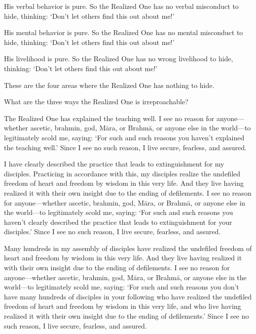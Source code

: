 \documentclass[12pt,openany]{book}%
\begin{document}
His verbal behavior is pure. So the Realized One has no verbal misconduct to hide, thinking: ‘Don’t let others find this out about me!’ 

His mental behavior is pure. So the Realized One has no mental misconduct to hide, thinking: ‘Don’t let others find this out about me!’ 

His livelihood is pure. So the Realized One has no wrong livelihood to hide, thinking: ‘Don’t let others find this out about me!’ 

These are the four areas where the Realized One has nothing to hide. 

What are the three ways the Realized One is irreproachable? 

The Realized One has explained the teaching well. I see no reason for anyone—whether ascetic, brahmin, god, \textsanskrit{Māra}, or \textsanskrit{Brahmā}, or anyone else in the world—to legitimately scold me, saying: ‘For such and such reasons you haven’t explained the teaching well.’ Since I see no such reason, I live secure, fearless, and assured. 

I have clearly described the practice that leads to extinguishment for my disciples. Practicing in accordance with this, my disciples realize the undefiled freedom of heart and freedom by wisdom in this very life. And they live having realized it with their own insight due to the ending of defilements. I see no reason for anyone—whether ascetic, brahmin, god, \textsanskrit{Māra}, or \textsanskrit{Brahmā}, or anyone else in the world—to legitimately scold me, saying: ‘For such and such reasons you haven’t clearly described the practice that leads to extinguishment for your disciples.’ Since I see no such reason, I live secure, fearless, and assured. 

Many hundreds in my assembly of disciples have realized the undefiled freedom of heart and freedom by wisdom in this very life. And they live having realized it with their own insight due to the ending of defilements. I see no reason for anyone—whether ascetic, brahmin, god, \textsanskrit{Māra}, or \textsanskrit{Brahmā}, or anyone else in the world—to legitimately scold me, saying: ‘For such and such reasons you don’t have many hundreds of disciples in your following who have realized the undefiled freedom of heart and freedom by wisdom in this very life, and who live having realized it with their own insight due to the ending of defilements.’ Since I see no such reason, I live secure, fearless, and assured. 
\end{document}
